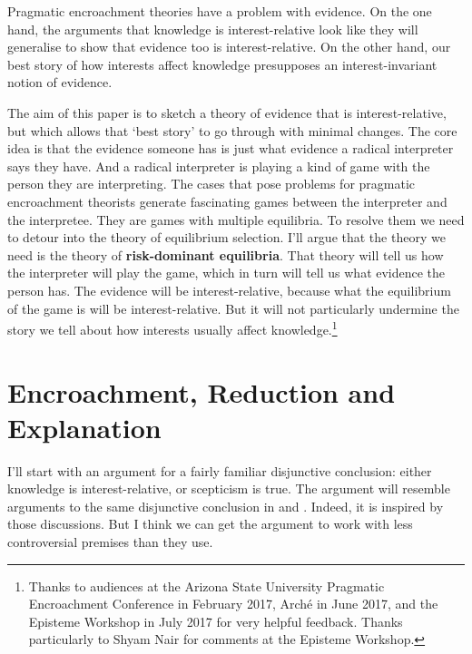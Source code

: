 \def\mytitle{Interests, Evidence and Games}
\def\shorttitle{Interests and Evidence}
\def\myauthor{Brian Weatherson}
\def\latexmode{Book}


Pragmatic encroachment theories have a problem with evidence. On the one hand, the arguments that knowledge is interest-relative look like they will generalise to show that evidence too is interest-relative. On the other hand, our best story of how interests affect knowledge presupposes an interest-invariant notion of evidence. 

The aim of this paper is to sketch a theory of evidence that is interest-relative, but which allows that `best story' to go through with minimal changes. The core idea is that the evidence someone has is just what evidence a radical interpreter says they have. And a radical interpreter is playing a kind of game with the person they are interpreting. The cases that pose problems for pragmatic encroachment theorists generate fascinating games between the interpreter and the interpretee. They are games with multiple equilibria. To resolve them we need to detour into the theory of equilibrium selection. I'll argue that the theory we need is the theory of \textbf{risk-dominant equilibria}. That theory will tell us how the interpreter will play the game, which in turn will tell us what evidence the person has. The evidence will be interest-relative, because what the equilibrium of the game is will be interest-relative. But it will not particularly undermine the story we tell about how interests usually affect knowledge.\footnote{Thanks to audiences at the Arizona State University Pragmatic Encroachment Conference in February 2017, Arché in June 2017, and the Episteme Workshop in July 2017 for very helpful feedback. Thanks particularly to Shyam Nair for comments at the Episteme Workshop.}

\section{Encroachment, Reduction and Explanation}
\label{encroachmentreductionandexplanation}

I'll start with an argument for a fairly familiar disjunctive conclusion: either knowledge is interest-relative, or scepticism is true. The argument will resemble arguments to the same disjunctive conclusion in  \citet{Hawthorne2004} and  \citet{FantlMcGrath2009}. Indeed, it is inspired by those discussions. But I think we can get the argument to work with less controversial premises than they use.

